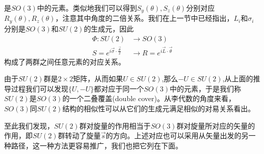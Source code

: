是$SO(3)$中的元素。类似地我们可以得到$S_{y}\left(\theta\right),S_{z}\left(\theta\right)$分别对应$R_{y}\left(\theta\right),R_{z}\left(\theta\right)$，注意其中角度的二倍关系。我们在上一节中已经指出，$L_{i}$和$\sigma_{i}$分别是$SO(3)$和$SU(2)$的生成元，因此
\begin{equation}
\begin{aligned}
    \Phi:SU(2)&\longrightarrow SO(3)\\
    S=e^{i\vec{\sigma}\cdot\frac{\vec{\theta}}{2}}&\longrightarrow R=e^{i\vec{L}\cdot\vec{\theta}}
    \end{aligned}
\end{equation}
构成了两群之间任意元素的对应关系。

由于$SU(2)$群是$2\times2$矩阵，从而如果$U\in SU(2)$,那么$-U\in SU(2)$,从上面的推导过程我们可以发现$\{U,-U\}$都对应于同一个$SO(3)$中的元素，于是我们称$SU(2)$是$SO(3)$的一个二叠覆盖(double cover)。从李代数的角度来看，$SO(3)$同$SU(2)$结构的相似性可以从它们的生成元满足相似的对易关系看出。

至此我们发现，$SU(2)$群对旋量的作用相当于$SO(3)$群对旋量所对应的矢量的作用，即$SU(2)$群转动了旋量$\vec{s}$的方向。上述对应也可以采用从矢量出发的另一种路径，这一种方法更容易推广，我们也把它列在下面。

